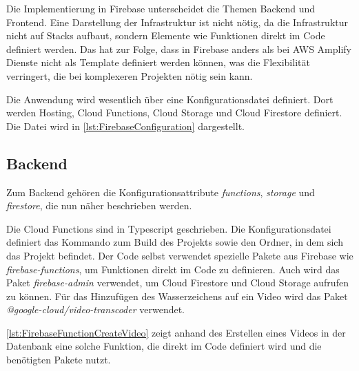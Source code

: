 Die Implementierung in Firebase unterscheidet die Themen Backend und Frontend. Eine Darstellung der Infrastruktur ist nicht nötig, da die Infrastruktur nicht auf Stacks aufbaut, sondern Elemente wie Funktionen direkt im Code definiert werden. Das hat zur Folge, dass in Firebase anders als bei \ac{AWS} Amplify Dienste nicht als Template definiert werden können, was die Flexibilität verringert, die bei komplexeren Projekten nötig sein kann.

Die Anwendung wird wesentlich über eine Konfigurationsdatei definiert. Dort werden Hosting, Cloud Functions, Cloud Storage und Cloud Firestore definiert. Die Datei wird in \autoref{lst:FirebaseConfiguration} dargestellt.



\subsection{Backend}

Zum Backend gehören die Konfigurationsattribute \textit{functions}, \textit{storage} und \textit{firestore}, die nun näher beschrieben werden.

Die Cloud Functions sind in Typescript geschrieben. Die Konfigurationsdatei definiert das Kommando zum Build des Projekts sowie den Ordner, in dem sich das Projekt befindet. Der Code selbst verwendet spezielle Pakete aus Firebase wie \textit{firebase-functions}, um Funktionen direkt im Code zu definieren. Auch wird das Paket \textit{firebase-admin} verwendet, um Cloud Firestore und Cloud Storage aufrufen zu können. Für das Hinzufügen des Wasserzeichens auf ein Video wird das Paket \textit{@google-cloud/video-transcoder} verwendet.

\autoref{lst:FirebaseFunctionCreateVideo} zeigt anhand des Erstellen eines Videos in der Datenbank eine solche Funktion, die direkt im Code definiert wird und die benötigten Pakete nutzt.



